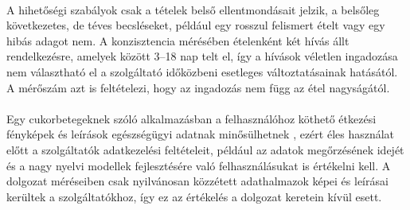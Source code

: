 \paragraph{}A hihetőségi szabályok csak a tételek belső ellentmondásait jelzik, a belsőleg 
következetes, de téves becsléseket, például egy rosszul felismert ételt vagy egy hibás adagot nem. 
A konzisztencia mérésében ételenként két hívás állt rendelkezésre, amelyek között 3--18 nap telt el, 
így a hívások véletlen ingadozása nem választható el a szolgáltató időközbeni esetleges változtatásainak 
hatásától. A mérőszám azt is feltételezi, hogy az ingadozás nem függ az étel nagyságától.

\paragraph{}Egy cukorbetegeknek szóló alkalmazásban a felhasználóhoz köthető étkezési fényképek és leírások 
egészségügyi adatnak minősülhetnek \cite{gdpr2016}, ezért éles használat előtt a szolgáltatók adatkezelési feltételeit, 
például az adatok megőrzésének idejét és a nagy nyelvi modellek fejlesztésére való felhasználásukat is értékelni kell. A dolgozat méréseiben
csak nyilvánosan közzétett adathalmazok képei és leírásai kerültek a szolgáltatókhoz, így ez az értékelés a dolgozat keretein 
kívül esett.
\clearpage
